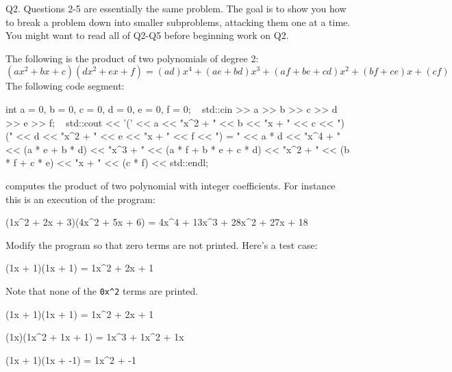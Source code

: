 Q2. Questions 2-5 are essentially the same problem. 
The goal is to show you how to break a problem down into smaller 
subproblems, attacking them one at a time. 
You might want to read all of Q2-Q5 before beginning work on Q2.

The following is the product of two polynomials of degree 2:
\[
(ax^2 + bx + c)(dx^2 + ex + f) = 
(ad)x^4 + (ae + bd)x^3 + (af + be + cd)x^2 + (bf + ce)x + (cf)
\]
The following code segment:
\begin{console}
int a = 0, b = 0, c = 0, d = 0, e = 0, f = 0;
 
std::cin >> a >> b >> c >> d >> e >> f;
 
std::cout << '('
          << a << "x^2 + "
          << b << "x + "
          << c << ")("
          << d << "x^2 + "
          << e << "x + "
          << f << ") = "
          << a * d << "x^4 + "
          << (a * e + b * d) << "x^3 + "
          << (a * f + b * e + c * d) << "x^2 + "
          << (b * f + c * e) << "x + "
          << (c * f) << std::endl;
\end{console}
computes the product of two polynomial with integer coefficients. 
For instance this is an execution of the program:
\begin{console}[commandchars=\\\{\}]
(1x^2 + 2x + 3)(4x^2 + 5x + 6) = 4x^4 + 13x^3 + 28x^2 + 27x + 18
\end{console}

Modify the program so that zero terms are not printed. 
Here's a test case:
\begin{console}[commandchars=\\\{\}]
(1x + 1)(1x + 1) = 1x^2 + 2x + 1
\end{console}
Note that none of the \verb!0x^2! terms are printed. 

\resett

\nextt
\begin{console}[commandchars=\\\{\}]
(1x + 1)(1x + 1) = 1x^2 + 2x + 1
\end{console}

\nextt
\begin{console}[commandchars=\\\{\}]
(1x)(1x^2 + 1x + 1) = 1x^3 + 1x^2 + 1x
\end{console}

\nextt
\begin{console}[commandchars=\\\{\}]
(1x + 1)(1x + -1) = 1x^2 + -1
\end{console}

